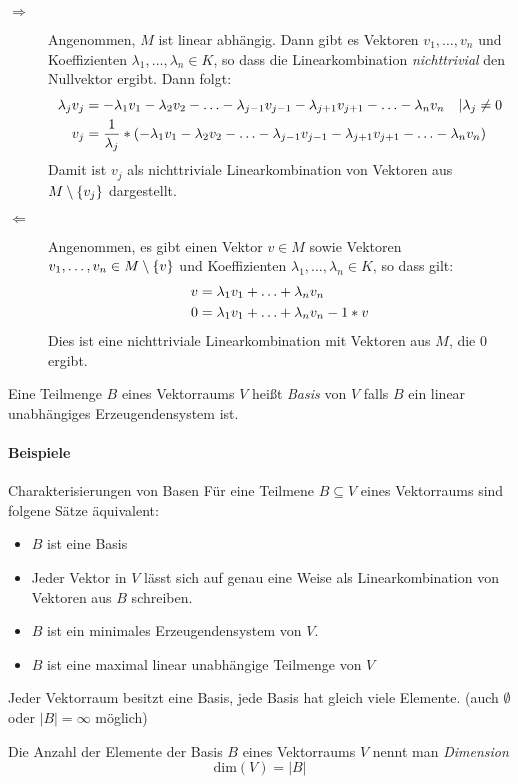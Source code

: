 \begin{description}
  \newcommand{\lv}[1]{\ensuremath\lambda_{#1}v_{#1}}
  \item[\glqq$\Rightarrow$\grqq] Angenommen, $M$ ist linear abhängig. Dann gibt es Vektoren $v_1,\ldots,v_n$ und Koeffizienten $\lambda_1,\ldots,\lambda_n \in K$, so dass die Linearkombination \emph{nichttrivial} den Nullvektor ergibt. Dann folgt:
  \begin{align*}
    \lv{j} &= -\lv{1}-\lv{2}-\ldots-\lv{j-1}-\lv{j+1}-\ldots-\lv{n} \quad |\lambda_j\neq0\\
    v_j &= \frac{1}{\lambda_j} * \left( -\lv{1}-\lv{2}-\ldots-\lv{j-1}-\lv{j+1}-\ldots-\lv{n} \right)
  \end{align*}
  Damit ist $v_j$ als nichttriviale Linearkombination von Vektoren aus $M\setminus\left\{ v_j \right\}$ dargestellt.


  \item[\glqq$\Leftarrow$\grqq] Angenommen, es gibt einen Vektor $v\in M$ sowie Vektoren $v_1,\ldots,v_n\in M\setminus\left\{ v \right\}$ und Koeffizienten $\lambda_1,\ldots,\lambda_n \in K$, so dass gilt:
  \begin{align*}
    v &= \lv{1}+\ldots+\lv{n}\\
    0 &= \lv{1}+\ldots+\lv{n} - 1*v
  \end{align*}
  Dies ist eine nichttriviale Linearkombination mit Vektoren aus $M$, die $0$ ergibt.
\end{description}


Eine Teilmenge $B$ eines Vektorraums $V$ heißt \emph{Basis} von $V$ falls $B$ ein linear unabhängiges Erzeugendensystem ist.

\paragraph{Beispiele}

\begin{satz}{Charakterisierungen von Basen}
  Für eine Teilmene $B\subseteq V$ eines Vektorraums sind folgene Sätze äquivalent:
  \begin{itemize}
    \item $B$ ist eine Basis
    \item Jeder Vektor in $V$ lässt sich auf genau eine Weise als Linearkombination von Vektoren aus $B$ schreiben.
    \item $B$ ist ein minimales Erzeugendensystem von $V$.
    \item $B$ ist eine maximal linear unabhängige Teilmenge von $V$
  \end{itemize}
\end{satz}

\bemerkung
Jeder Vektorraum besitzt eine Basis, jede Basis hat gleich viele Elemente. (auch $\emptyset$ oder $|B|=\infty$ möglich)

Die Anzahl der Elemente der Basis $B$ eines Vektorraums $V$ nennt man \emph{Dimension}
\begin{equation*}
  \mathrm{dim}(V)=|B|
\end{equation*}
